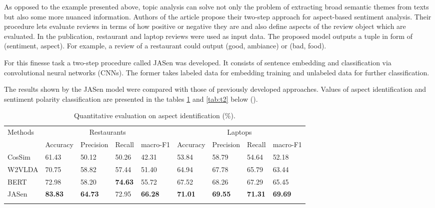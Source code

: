\documentclass[3p,times,procedia]{elsarticle}
\begin{document}
As opposed to the example presented above, topic analysis can solve not only the problem of extracting broad semantic themes from texts but also some more nuanced information. Authors of the article \cite{huang2020weakly} propose their two-step approach for aspect-based sentiment analysis. Their procedure lets evaluate reviews in terms of how positive or negative they are and also define aspects of the review object which are evaluated. In the publication, restaurant and laptop reviews were used as input data. The proposed model outputs a tuple in form of (sentiment, aspect). For example, a review of a restaurant could output (good, ambiance) or (bad, food).

For this finesse task a two-step procedure called JASen was developed. It consists of sentence embedding and classification via convolutional neural networks (CNNs). The former takes labeled data for embedding training and unlabeled data for further classification.

The results shown by the JASen model were compared with those of previously developed approaches. Values of aspect identification and sentiment polarity classification are presented in the tables \ref{tab:t1} and \ref{tab:t2} below (\cite{huang2020weakly}).

\begin{table}[h]
\caption{Quantitative evaluation on aspect identification (\%).}
\label{tab:t1}
\begin{tabular*}{\hsize}{@{\extracolsep{\fill}}lllllllll@{}}
\toprule
\multirow{2}{*}{Methods} & \multicolumn{4}{c}{Restaurants}          & \multicolumn{4}{c}{Laptops}              \\ 
                         & Accuracy & Precision & Recall & macro-F1 & Accuracy & Precision & Recall & macro-F1 \\
\colrule
CosSim & 61.43 & 50.12 & 50.26 & 42.31 & 53.84 & 58.79 & 54.64 & 52.18 \\
W2VLDA & 70.75 & 58.82 & 57.44 & 51.40 & 64.94 & 67.78 & 65.79 & 63.44 \\
BERT & 72.98 & 58.20 & \textbf{74.63} & 55.72 & 67.52 & 68.26 & 67.29 & 65.45 \\
JASen & \textbf{83.83} & \textbf{64.73} & 72.95 & \textbf{66.28} & \textbf{71.01} & \textbf{69.55} & \textbf{71.31} & \textbf{69.69} \\
\botrule
\end{tabular*}
\end{table}
\end{document}
